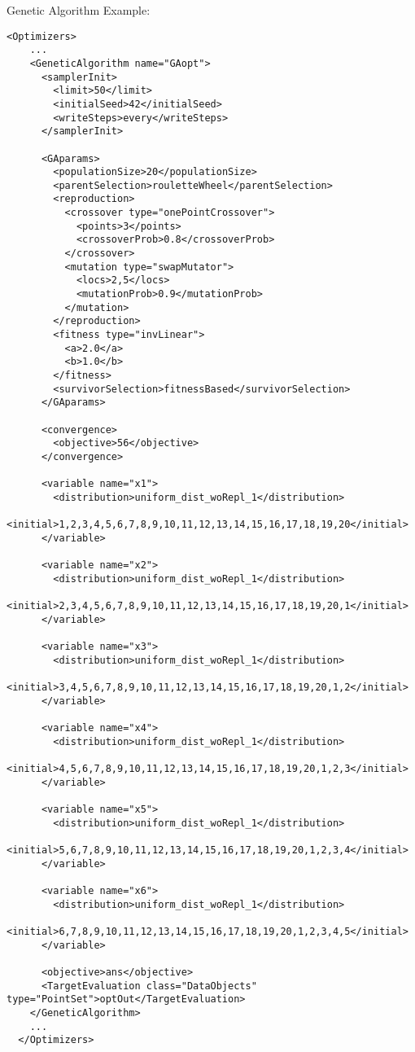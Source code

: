 \hspace{24pt}
Genetic Algorithm Example:
\begin{lstlisting}[style=XML]
  <Optimizers>
    ...
    <GeneticAlgorithm name="GAopt">
      <samplerInit>
        <limit>50</limit>
        <initialSeed>42</initialSeed>
        <writeSteps>every</writeSteps>
      </samplerInit>

      <GAparams>
        <populationSize>20</populationSize>
        <parentSelection>rouletteWheel</parentSelection>
        <reproduction>
          <crossover type="onePointCrossover">
            <points>3</points>
            <crossoverProb>0.8</crossoverProb>
          </crossover>
          <mutation type="swapMutator">
            <locs>2,5</locs>
            <mutationProb>0.9</mutationProb>
          </mutation>
        </reproduction>
        <fitness type="invLinear">
          <a>2.0</a>
          <b>1.0</b>
        </fitness>
        <survivorSelection>fitnessBased</survivorSelection>
      </GAparams>

      <convergence>
        <objective>56</objective>
      </convergence>

      <variable name="x1">
        <distribution>uniform_dist_woRepl_1</distribution>
        <initial>1,2,3,4,5,6,7,8,9,10,11,12,13,14,15,16,17,18,19,20</initial>
      </variable>

      <variable name="x2">
        <distribution>uniform_dist_woRepl_1</distribution>
        <initial>2,3,4,5,6,7,8,9,10,11,12,13,14,15,16,17,18,19,20,1</initial>
      </variable>

      <variable name="x3">
        <distribution>uniform_dist_woRepl_1</distribution>
        <initial>3,4,5,6,7,8,9,10,11,12,13,14,15,16,17,18,19,20,1,2</initial>
      </variable>

      <variable name="x4">
        <distribution>uniform_dist_woRepl_1</distribution>
        <initial>4,5,6,7,8,9,10,11,12,13,14,15,16,17,18,19,20,1,2,3</initial>
      </variable>

      <variable name="x5">
        <distribution>uniform_dist_woRepl_1</distribution>
        <initial>5,6,7,8,9,10,11,12,13,14,15,16,17,18,19,20,1,2,3,4</initial>
      </variable>

      <variable name="x6">
        <distribution>uniform_dist_woRepl_1</distribution>
        <initial>6,7,8,9,10,11,12,13,14,15,16,17,18,19,20,1,2,3,4,5</initial>
      </variable>

      <objective>ans</objective>
      <TargetEvaluation class="DataObjects" type="PointSet">optOut</TargetEvaluation>
    </GeneticAlgorithm>
    ...
  </Optimizers>
\end{lstlisting}


